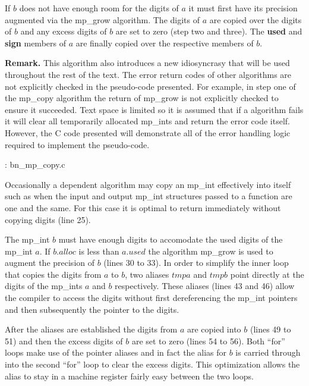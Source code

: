 \documentclass[b5paper]{book}
\begin{document}
If $b$ does not have enough room for the digits of $a$ it must first have its precision augmented via the mp\_grow 
algorithm.  The digits of $a$ are copied over the digits of $b$ and any excess digits of $b$ are set to zero (step two
and three).  The \textbf{used} and \textbf{sign} members of $a$ are finally copied over the respective members of
$b$.

\textbf{Remark.}  This algorithm also introduces a new idiosyncrasy that will be used throughout the rest of the
text.  The error return codes of other algorithms are not explicitly checked in the pseudo-code presented.  For example, in 
step one of the mp\_copy algorithm the return of mp\_grow is not explicitly checked to ensure it succeeded.  Text space is 
limited so it is assumed that if a algorithm fails it will clear all temporarily allocated mp\_ints and return
the error code itself.  However, the C code presented will demonstrate all of the error handling logic required to 
implement the pseudo-code.

\vspace{+3mm}\begin{small}
\hspace{-5.1mm}{\bf File}: bn\_mp\_copy.c
\vspace{-3mm}
\begin{alltt}
\end{alltt}
\end{small}

Occasionally a dependent algorithm may copy an mp\_int effectively into itself such as when the input and output
mp\_int structures passed to a function are one and the same.  For this case it is optimal to return immediately without 
copying digits (line 25).  

The mp\_int $b$ must have enough digits to accomodate the used digits of the mp\_int $a$.  If $b.alloc$ is less than
$a.used$ the algorithm mp\_grow is used to augment the precision of $b$ (lines 30 to 33).  In order to
simplify the inner loop that copies the digits from $a$ to $b$, two aliases $tmpa$ and $tmpb$ point directly at the digits
of the mp\_ints $a$ and $b$ respectively.  These aliases (lines 43 and 46) allow the compiler to access the digits without first dereferencing the
mp\_int pointers and then subsequently the pointer to the digits.  

After the aliases are established the digits from $a$ are copied into $b$ (lines 49 to 51) and then the excess 
digits of $b$ are set to zero (lines 54 to 56).  Both ``for'' loops make use of the pointer aliases and in 
fact the alias for $b$ is carried through into the second ``for'' loop to clear the excess digits.  This optimization 
allows the alias to stay in a machine register fairly easy between the two loops.
\end{document}
